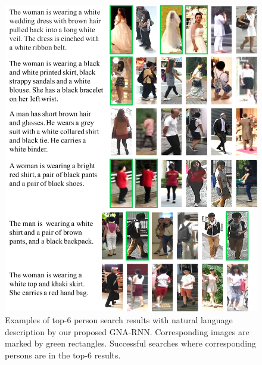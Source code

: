 \begin{figure}[t]
	\begin{center}
		\includegraphics[width=0.9\linewidth]{figures/person_nlp/retrieval.pdf}
		\vspace{-7pt}
	\end{center}
	\caption{Examples of top-6 person search results with natural language description by our proposed GNA-RNN. Corresponding images are marked by green rectangles. Successful searches where corresponding persons are in the top-6 results.}
	\label{fig:finalexamples}
	\vspace{-7pt}
\end{figure}

